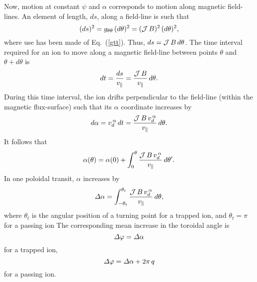 \documentclass[12pt,prb,aps,notitlepage]{revtex4-1}
\begin{document}
 Now, motion at constant $\psi$ and $\alpha$ corresponds to motion along magnetic field-lines. An element of length, $ds$, along
 a field-line is such that
 \begin{equation}
 (ds)^2 = g_{\theta\theta}\,(d\theta)^2= ({\cal J}\,B)^2\,(d\theta)^2,
 \end{equation}
 where use has been made of Eq.~(\ref{gtt}). Thus, $ds = {\cal J}\,B\,d\theta$. The time interval required for an ion to move along a
 magnetic field-line between points $\theta$ and $\theta+d\theta$ is
 \begin{equation}\label{dt}
 dt = \frac{ds}{v_\parallel} =\frac{{\cal J}\,B}{v_\parallel}\,d\theta.
 \end{equation}
 During this time interval, the ion drifts perpendicular to the field-line (within the magnetic flux-surface) such that its $\alpha$ coordinate
 increases by
 \begin{equation}
 d\alpha =v_d^{\,\alpha}\,dt =\frac{{\cal J}\,B\,v_d^{\,\alpha}}{v_\parallel}\,d\theta.
 \end{equation}
 It follows that
 \begin{equation}
 \alpha(\theta)= \alpha(0) + \int_0^\theta\frac{{\cal J}\,B\,v_d^{\,\alpha}}{v_\parallel}\,d\theta'.
 \end{equation}
  In one poloidal transit, $\alpha$ increases by
 \begin{equation}
 {\mit\Delta}\alpha = \int_{-\theta_t}^{\theta_t}\frac{{\cal J}\,B\,v_d^{\,\alpha}}{v_\parallel}\,d\theta,
 \end{equation}
 where $\theta_t$ is the angular position of a turning point for a trapped ion, and $\theta_t=\pi$ for a passing ion 
 The corresponding mean increase in the toroidal angle is
 \begin{equation}
 {\mit\Delta}\varphi = {\mit\Delta}\alpha
 \end{equation}
 for a trapped ion, 
 \begin{equation}
 {\mit\Delta}\varphi = {\mit\Delta}\alpha+ 2\pi\,q
 \end{equation}
 for a passing ion. 
 
\end{document}
